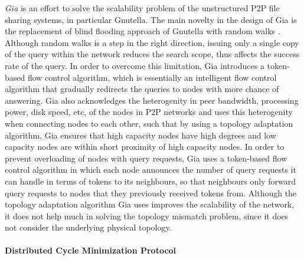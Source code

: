 \documentclass[acmcsur]{acmtrans2m}
\begin{document}
\emph{Gia} \cite{chawathe_gia_2003} is an effort to solve the scalability
problem of the unstructured P2P file sharing systems, in particular Gnutella.
The main novelty in the design of Gia is the replacement of blind flooding
approach of Gnutella with random walks \cite{lv_randomwalks_2002}. Although
random walks is a step in the right direction, issuing only a single copy of the
query within the network reduces the search scope, thus affects the success rate
of the query.  In order to overcome this limitation, Gia introduces a
token-based flow control algorithm, which is essentially an intelligent flow
control algorithm that gradually redirects the queries to nodes with more chance
of answering. Gia also acknowledges the heterogenity in peer bandwidth,
processing power, disk speed, etc, of the nodes in P2P networks and uses this
heterogenity when connecting nodes to each other, such that by using a topology
adaptation algorithm, Gia ensures that high capacity nodes have high degrees and
low capacity nodes are within short proximity of high capacity nodes. In order
to prevent overloading of nodes with query requests, Gia uses a token-based flow
control algorithm in which each node announces the number of query requests it
can handle in terms of tokens to its neighbours, so that neighbours only forward
query requests to nodes that they previously received tokens from. Although the
topology adaptation algorithm Gia uses improves the scalability of the network,
it does not help much in solving the topology mismatch problem, since it does
not consider the underlying physical topology.

\paragraph*{\bf Distributed Cycle Minimization Protocol}
\end{document}
